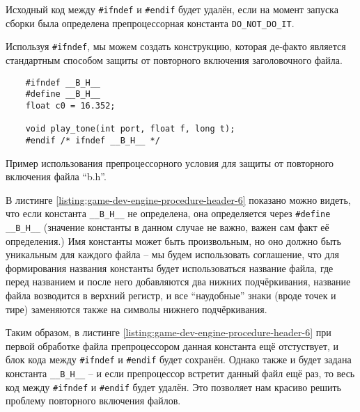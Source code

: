 \documentclass[../sparc.tex]{subfiles}
\begin{document}
Исходный код между \texttt{#ifndef} и \texttt{#endif} будет
удалён, если на момент запуска сборки была определена препроцессорная константа
\texttt{DO_NOT_DO_IT}.

Используя \texttt{#ifndef}, мы можем создать конструкцию, которая
де-факто является стандартным способом защиты от повторного включения
заголовочного файла.

\begin{listing}[H]
  \begin{verbatim}
    #ifndef __B_H__
    #define __B_H__
    float c0 = 16.352;

    void play_tone(int port, float f, long t);
    #endif /* ifndef __B_H__ */
  \end{verbatim}
  \label{listing:game-dev-engine-procedure-header-6}
  \caption{Пример использования препроцессорного условия для защиты от
    повторного включения файла ``b.h''.}
\end{listing}

В листинге \ref{listing:game-dev-engine-procedure-header-6} показано можно
видеть, что если константа \texttt{__B_H__} не определена, она
определяется через \texttt{#define __B_H__} (значение константы в
данном случае не важно, важен сам факт её определения.)  Имя константы может
быть произвольным, но оно должно быть уникальным для каждого файла -- мы будем
использовать соглашение, что для формирования названия константы будет
использоваться название файла, где перед названием и после него добавляются два
нижних подчёркивания, название файла возводится в верхний регистр, и все
``наудобные'' знаки (вроде точек и тире) заменяются также на символы нижнего
подчёркивания.

Таким образом, в листинге \ref{listing:game-dev-engine-procedure-header-6} при
первой обработке файла препроцессором данная константа ещё отстуствует, и блок
кода между \texttt{#ifndef} и \texttt{#endif} будет сохранён.
Однако также и будет задана константа \texttt{__B_H__} -- и если
препроцессор встретит данный файл ещё раз, то весь код между
\texttt{#ifndef} и \texttt{#endif} будет удалён.  Это
позволяет нам красиво решить проблему повторного включения файлов.
\end{document}
